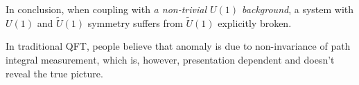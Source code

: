 In conclusion, when coupling with \emph{a non-trivial $U(1)$ background}, a system with $U(1)$ and $\tilde{U}(1)$ symmetry suffers from $\tilde{U}(1)$ explicitly broken.

In traditional QFT, people believe that anomaly is due to non-invariance of path integral measurement, which is, however, presentation dependent and doesn't reveal the true picture.

